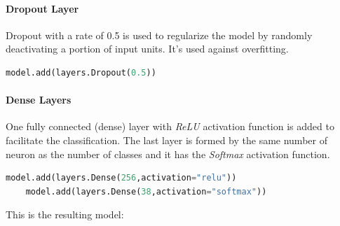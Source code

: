 \paragraph{Dropout Layer}
Dropout with a rate of 0.5 is used to regularize the model by randomly deactivating a portion of input units. It's 
used against overfitting.

\begin{lstlisting}[language=Python]
	model.add(layers.Dropout(0.5))
\end{lstlisting}

\paragraph{Dense Layers}
One fully connected (dense) layer with \textit{ReLU} activation function is added to facilitate the classification. The last 
layer is formed by the same number of neuron as the number of classes and it has the \textit{Softmax} activation function.

\begin{lstlisting}[language=Python]
	model.add(layers.Dense(256,activation="relu"))
	model.add(layers.Dense(38,activation="softmax"))
\end{lstlisting}

This is the resulting model:

